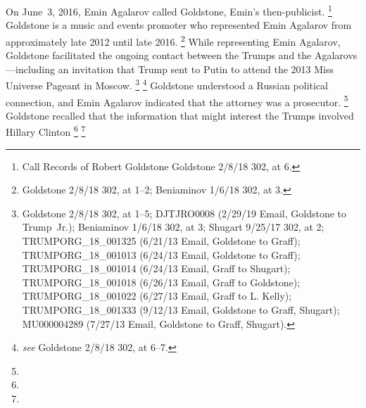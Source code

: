 On June~3, 2016, Emin Agalarov called Goldstone, Emin's then-publicist.%
\footnote{Call Records of Robert Goldstone  Goldstone 2/8/18 302, at 6.}
Goldstone is a music and events promoter who represented Emin Agalarov from approximately late 2012 until late 2016.%
\footnote{Goldstone 2/8/18 302, at 1--2;  Beniaminov 1/6/18 302, at 3.}
While representing Emin Agalarov, Goldstone facilitated the ongoing contact between the Trumps and the Agalarovs---including an invitation that Trump sent to Putin to attend the 2013 Miss Universe Pageant in Moscow.%
\footnote{Goldstone 2/8/18 302, at 1--5; 
DJTJRO0008 (2/29/19 Email, Goldstone to Trump~Jr.);
Beniaminov 1/6/18 302, at 3;
Shugart 9/25/17 302, at 2;
TRUMPORG\_18\_001325 (6/21/13 Email, Goldstone to Graff);
TRUMPORG\_18\_001013 (6/24/13 Email, Goldstone to Graff);
TRUMPORG\_18\_001014 (6/24/13 Email, Graff to Shugart);
TRUMPORG\_18\_001018 (6/26/13 Email, Graff to Goldstone);
TRUMPORG\_18\_001022 (6/27/13 Email, Graff to L. Kelly);
TRUMPORG\_18\_001333 (9/12/13 Email, Goldstone to Graff, Shugart);
MU000004289 (7/27/13 Email, Goldstone to Graff, Shugart).}
\footnote{ \textit{see} Goldstone 2/8/18 302, at 6--7.}
Goldstone understood
a Russian political connection, and Emin Agalarov indicated that the attorney was a prosecutor.%
\footnote{}
Goldstone recalled that the information that might interest the Trumps involved Hillary Clinton
\footnote{}
\footnote{}

